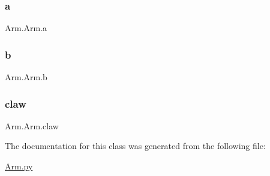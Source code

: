 \subsubsection{\texorpdfstring{a}{a}}
{\footnotesize\ttfamily Arm.\+Arm.\+a}

\mbox{\label{class_arm_1_1_arm_a0cc68385222efa1318c95a5d1226773c}} 
\subsubsection{\texorpdfstring{b}{b}}
{\footnotesize\ttfamily Arm.\+Arm.\+b}

\mbox{\label{class_arm_1_1_arm_ab07711ba5be70642e2cc07fe4e749722}} 
\subsubsection{\texorpdfstring{claw}{claw}}
{\footnotesize\ttfamily Arm.\+Arm.\+claw}



The documentation for this class was generated from the following file\+:\begin{DoxyCompactItemize}
\item 
\mbox{\hyperlink{_arm_8py}{Arm.\+py}}\end{DoxyCompactItemize}
